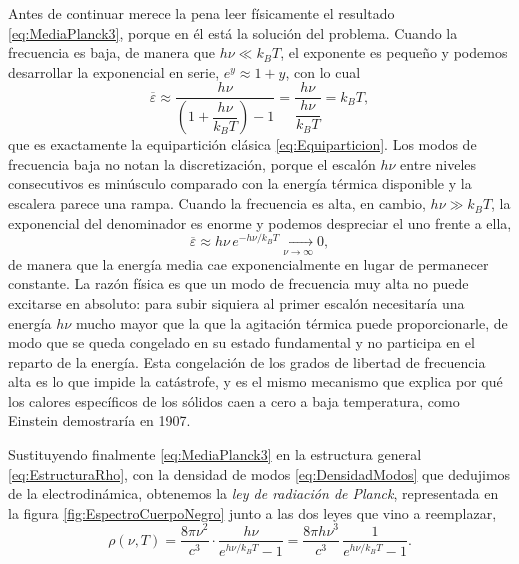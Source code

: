             Antes de continuar merece la pena leer físicamente el resultado \eqref{eq:MediaPlanck3}, porque en él está la solución del problema. Cuando la frecuencia es baja, de manera que $h\nu \ll k_{B}T$, el exponente es pequeño y podemos desarrollar la exponencial en serie, $e^{y} \approx 1 + y$, con lo cual
            \begin{equation}\label{eq:LimiteBajaFrec}
                \overline{\varepsilon} \approx \frac{h\nu}{\left(1 + \dfrac{h\nu}{k_{B}T}\right)-1} = \frac{h\nu}{\dfrac{h\nu}{k_{B}T}} = k_{B}T,
            \end{equation}
            que es exactamente la equipartición clásica \eqref{eq:Equiparticion}. Los modos de frecuencia baja no notan la discretización, porque el escalón $h\nu$ entre niveles consecutivos es minúsculo comparado con la energía térmica disponible y la escalera parece una rampa. Cuando la frecuencia es alta, en cambio, $h\nu \gg k_{B}T$, la exponencial del denominador es enorme y podemos despreciar el uno frente a ella,
            \begin{equation}\label{eq:LimiteAltaFrec}
                \overline{\varepsilon} \approx h\nu\,e^{-h\nu/k_{B}T} \xrightarrow[\nu\to\infty]{} 0,
            \end{equation}
            de manera que la energía media cae exponencialmente en lugar de permanecer constante. La razón física es que un modo de frecuencia muy alta no puede excitarse en absoluto: para subir siquiera al primer escalón necesitaría una energía $h\nu$ mucho mayor que la que la agitación térmica puede proporcionarle, de modo que se queda congelado en su estado fundamental y no participa en el reparto de la energía. Esta congelación de los grados de libertad de frecuencia alta es lo que impide la catástrofe, y es el mismo mecanismo que explica por qué los calores específicos de los sólidos caen a cero a baja temperatura, como Einstein demostraría en 1907.

            Sustituyendo finalmente \eqref{eq:MediaPlanck3} en la estructura general \eqref{eq:EstructuraRho}, con la densidad de modos \eqref{eq:DensidadModos} que dedujimos de la electrodinámica, obtenemos la \textit{ley de radiación de Planck}, representada en la figura \ref{fig:EspectroCuerpoNegro} junto a las dos leyes que vino a reemplazar,
            \begin{equation}\label{eq:LeyPlanck}
                \boxed{\;\rho(\nu,T) = \frac{8\pi\nu^{2}}{c^{3}}\cdot\frac{h\nu}{e^{h\nu/k_{B}T}-1} = \frac{8\pi h\nu^{3}}{c^{3}}\,\frac{1}{e^{h\nu/k_{B}T}-1} .\;}
            \end{equation}

